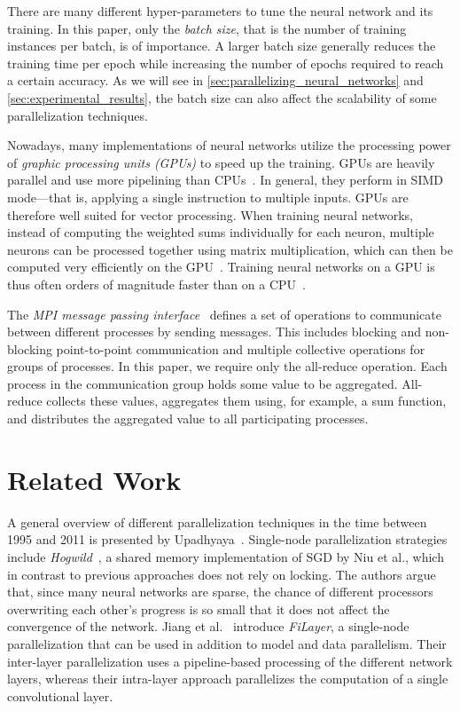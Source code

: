 \documentclass[conference]{IEEEtran}
\begin{document}
There are many different hyper-parameters to tune the neural network and its training.
In this paper, only the \emph{batch size}, that is the number of training instances per batch, is of importance.
A larger batch size generally reduces the training time per epoch while increasing the number of epochs required to reach a certain accuracy.
As we will see in \autoref{sec:parallelizing_neural_networks} and \ref{sec:experimental_results}, the batch size can also affect the scalability of some parallelization techniques.

Nowadays, many implementations of neural networks utilize the processing power of \emph{graphic processing units (GPUs)} to speed up the training.
GPUs are heavily parallel and use more pipelining than CPUs~\cite{oh2004gpu}.
In general, they perform in SIMD mode---that is, applying a single instruction to multiple inputs.
GPUs are therefore well suited for vector processing.
%
When training neural networks, instead of computing the weighted sums individually for each neuron, multiple neurons can be processed together using matrix multiplication, which can then be computed very efficiently on the GPU~\cite{oh2004gpu}.
Training neural networks on a GPU is thus often orders of magnitude faster than on a CPU~\cite{oh2004gpu,strigl2010performance}.

The \emph{MPI message passing interface}~\cite{walker1996mpi} defines a set of operations to communicate between different processes by sending messages.
This includes blocking and non-blocking point-to-point communication and multiple collective operations for groups of processes.
In this paper, we require only the all-reduce operation.
Each process in the communication group holds some value to be aggregated.
All-reduce collects these values, aggregates them using, for example, a sum function, and distributes the aggregated value to all participating processes.


\section{Related Work} %
\label{sec:related_work}
A general overview of different parallelization techniques in the time between 1995 and 2011 is presented by Upadhyaya~\cite{upadhyaya2013parallel}.
%
Single-node parallelization strategies include \emph{Hogwild}~\cite{recht2011-Hogwild}, a shared memory implementation of SGD by Niu et al., which in contrast to previous approaches does not rely on locking.
The authors argue that, since many neural networks are sparse, the chance of different processors overwriting each other's progress is so small that it does not affect the convergence of the network.
%
Jiang et al.~\cite{jiang2018-FiLayer} introduce \emph{FiLayer}, a single-node parallelization that can be used in addition to model and data parallelism.
Their inter-layer parallelization uses a pipeline-based processing of the different network layers, whereas their intra-layer approach parallelizes the computation of a single convolutional layer.
\end{document}
